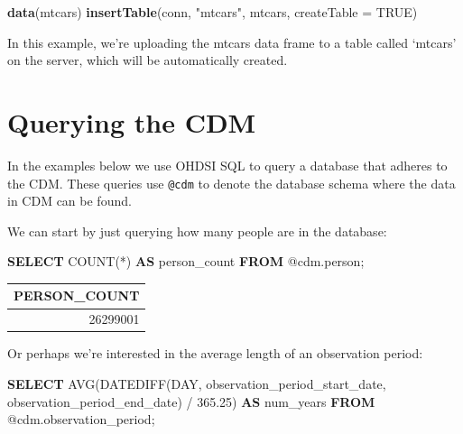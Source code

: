 \documentclass[]{book}
\newenvironment{Shaded}{\begin{snugshade}}{\end{snugshade}}
\newcommand{\KeywordTok}[1]{\textcolor[rgb]{0.13,0.29,0.53}{\textbf{#1}}}
\newcommand{\DataTypeTok}[1]{\textcolor[rgb]{0.13,0.29,0.53}{#1}}
\newcommand{\FloatTok}[1]{\textcolor[rgb]{0.00,0.00,0.81}{#1}}
\newcommand{\StringTok}[1]{\textcolor[rgb]{0.31,0.60,0.02}{#1}}
\newcommand{\OtherTok}[1]{\textcolor[rgb]{0.56,0.35,0.01}{#1}}
\newcommand{\FunctionTok}[1]{\textcolor[rgb]{0.00,0.00,0.00}{#1}}
\newcommand{\NormalTok}[1]{#1}
\begin{document}
\begin{Shaded}
\begin{Highlighting}[]
\KeywordTok{data}\NormalTok{(mtcars)}
\KeywordTok{insertTable}\NormalTok{(conn, }\StringTok{"mtcars"}\NormalTok{, mtcars, }\DataTypeTok{createTable =} \OtherTok{TRUE}\NormalTok{)}
\end{Highlighting}
\end{Shaded}

In this example, we're uploading the mtcars data frame to a table called
`mtcars' on the server, which will be automatically created.

\section{Querying the CDM}\label{QueryTheCdm}

In the examples below we use OHDSI SQL to query a database that adheres
to the CDM. These queries use \texttt{@cdm} to denote the database
schema where the data in CDM can be found.

We can start by just querying how many people are in the database:

\begin{Shaded}
\begin{Highlighting}[]
\KeywordTok{SELECT} \FunctionTok{COUNT}\NormalTok{(*) }\KeywordTok{AS}\NormalTok{ person_count }\KeywordTok{FROM}\NormalTok{ @cdm.person;}
\end{Highlighting}
\end{Shaded}

\begin{longtable}[]{@{}r@{}}
\toprule
PERSON\_COUNT\tabularnewline
\midrule
\endhead
26299001\tabularnewline
\bottomrule
\end{longtable}

Or perhaps we're interested in the average length of an observation
period:

\begin{Shaded}
\begin{Highlighting}[]
\KeywordTok{SELECT} \FunctionTok{AVG}\NormalTok{(DATEDIFF(}\DataTypeTok{DAY}\NormalTok{, }
\NormalTok{                    observation_period_start_date, }
\NormalTok{                    observation_period_end_date) / }\FloatTok{365.25}\NormalTok{) }\KeywordTok{AS}\NormalTok{ num_years}
\KeywordTok{FROM}\NormalTok{ @cdm.observation_period;}
\end{Highlighting}
\end{Shaded}
\end{document}
